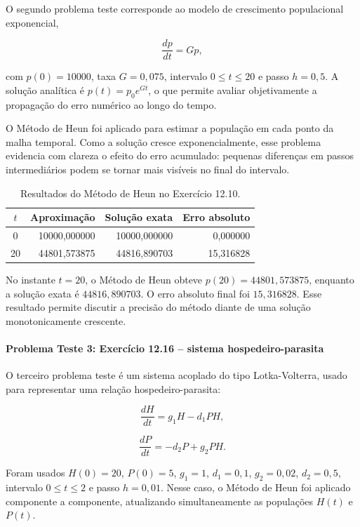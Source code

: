 O segundo problema teste corresponde ao modelo de crescimento populacional exponencial,

\[
    \frac{dp}{dt}=Gp,
\]

com \(p(0)=10000\), taxa \(G=0{,}075\), intervalo \(0\leq t\leq 20\) e passo \(h=0{,}5\). A solução analítica é \(p(t)=p_0e^{Gt}\), o que permite avaliar objetivamente a propagação do erro numérico ao longo do tempo.

O Método de Heun foi aplicado para estimar a população em cada ponto da malha temporal. Como a solução cresce exponencialmente, esse problema evidencia com clareza o efeito do erro acumulado: pequenas diferenças em passos intermediários podem se tornar mais visíveis no final do intervalo.

\begin{table}[H]
    \centering
    \caption{Resultados do Método de Heun no Exercício 12.10.}
    \begin{tabular}{c|r|r|r}
        \textbf{\(t\)} & \textbf{Aproximação} & \textbf{Solução exata} & \textbf{Erro absoluto} \\
        \hline
        0 & 10000{,}000000 & 10000{,}000000 & 0{,}000000 \\
        20 & 44801{,}573875 & 44816{,}890703 & 15{,}316828 \\
    \end{tabular}
\end{table}

No instante \(t=20\), o Método de Heun obteve \(p(20)=44801{,}573875\), enquanto a solução exata é \(44816{,}890703\). O erro absoluto final foi \(15{,}316828\). Esse resultado permite discutir a precisão do método diante de uma solução monotonicamente crescente.

\paragraph{Problema Teste 3: Exercício 12.16 -- sistema hospedeiro-parasita}

O terceiro problema teste é um sistema acoplado do tipo Lotka-Volterra, usado para representar uma relação hospedeiro-parasita:

\[
    \frac{dH}{dt}=g_1H-d_1PH,
\]

\[
    \frac{dP}{dt}=-d_2P+g_2PH.
\]

Foram usados \(H(0)=20\), \(P(0)=5\), \(g_1=1\), \(d_1=0{,}1\), \(g_2=0{,}02\), \(d_2=0{,}5\), intervalo \(0\leq t\leq 2\) e passo \(h=0{,}01\). Nesse caso, o Método de Heun foi aplicado componente a componente, atualizando simultaneamente as populações \(H(t)\) e \(P(t)\).

